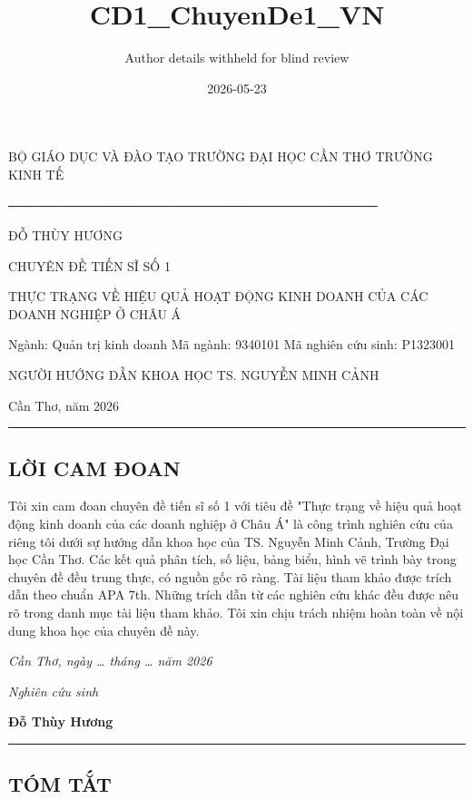 \documentclass[12pt,a4paper]{article}
\title{CD1\_ChuyenDe1\_VN}
\author{Author details withheld for blind review}
\date{2026-05-23}
\begin{document}
\maketitle

BỘ GIÁO DỤC VÀ ĐÀO TẠO TRƯỜNG ĐẠI HỌC CẦN THƠ TRƯỜNG KINH TẾ

─────────────────────────────────────────

ĐỖ THÙY HƯƠNG

CHUYÊN ĐỀ TIẾN SĨ SỐ 1

THỰC TRẠNG VỀ HIỆU QUẢ HOẠT ĐỘNG KINH DOANH CỦA CÁC DOANH NGHIỆP Ở CHÂU
Á

Ngành: Quản trị kinh doanh Mã ngành: 9340101 Mã nghiên cứu sinh:
P1323001

NGƯỜI HƯỚNG DẪN KHOA HỌC TS. NGUYỄN MINH CẢNH

Cần Thơ, năm 2026

\begin{center}\rule{0.5\linewidth}{0.5pt}\end{center}

\hypertarget{lux1eddi-cam-ux111oan}{%
\subsection{LỜI CAM ĐOAN}\label{lux1eddi-cam-ux111oan}}

Tôi xin cam đoan chuyên đề tiến sĩ số 1 với tiêu đề "Thực trạng về hiệu
quả hoạt động kinh doanh của các doanh nghiệp ở Châu Á" là công trình
nghiên cứu của riêng tôi dưới sự hướng dẫn khoa học của TS. Nguyễn Minh
Cảnh, Trường Đại học Cần Thơ. Các kết quả phân tích, số liệu, bảng biểu,
hình vẽ trình bày trong chuyên đề đều trung thực, có nguồn gốc rõ ràng.
Tài liệu tham khảo được trích dẫn theo chuẩn APA 7th. Những trích dẫn từ
các nghiên cứu khác đều được nêu rõ trong danh mục tài liệu tham khảo.
Tôi xin chịu trách nhiệm hoàn toàn về nội dung khoa học của chuyên đề
này.

\emph{Cần Thơ, ngày \ldots{} tháng \ldots{} năm 2026}

\emph{Nghiên cứu sinh}

\textbf{Đỗ Thùy Hương}

\begin{center}\rule{0.5\linewidth}{0.5pt}\end{center}

\hypertarget{tuxf3m-tux1eaft}{%
\subsection{TÓM TẮT}\label{tuxf3m-tux1eaft}}
\end{document}
